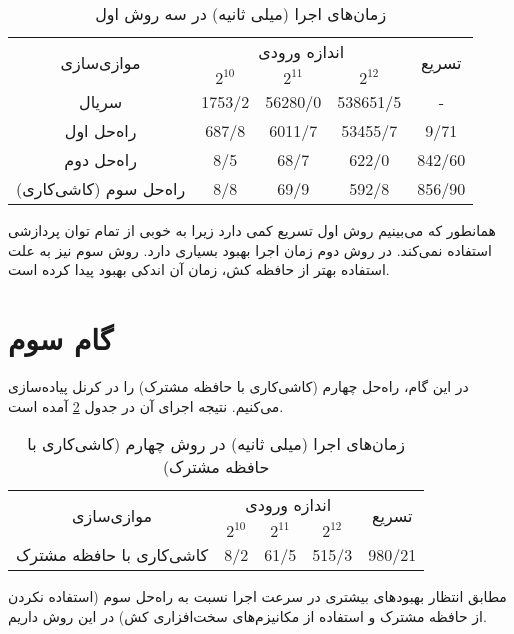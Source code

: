 \documentclass{HW}
\begin{document}
\begin{table}[ht]
\caption{زمان‌های اجرا (میلی ثانیه) در سه روش اول}
\begin{center}
\begin{tabular}{|c|c|c|c|c|}
    \hline
    \multirow{2}{*}{موازی‌سازی} & \multicolumn{3}{|c|}{اندازه ورودی}& \multirow{2}{*}{تسریع} \\
    \cline{2-4}
& $2^{10}$ & $2^{11}$ & $2^{12}$ & \\
    \hline
  سریال & 
  1753/2 & 56280/0 & 538651/5 & - \\ \hline
  
راه‌حل اول &
  687/8 & 6011/7 & 53455/7 & 9/71 \\ \hline
  
راه‌حل دوم & 
  8/5 & 68/7 & 622/0 & 842/60 \\ \hline
 
 راه‌حل سوم (کاشی‌کاری) & 
  8/8 & 69/9 & 592/8 & 856/90 \\ \hline
\end{tabular}
\end{center}
\label{tab:section2-results}
\end{table}

همانطور که می‌بینیم روش اول تسریع کمی دارد زیرا به خوبی از تمام توان پردازشی  استفاده نمی‌کند. در روش دوم زمان اجرا بهبود بسیاری دارد. روش سوم نیز به علت استفاده بهتر از حافظه کش، زمان ‌آن اندکی بهبود پیدا کرده است.


\section{گام سوم}

در این گام، راه‌حل چهارم (کاشی‌کاری با حافظه مشترک) را در کرنل  پیاده‌سازی می‌کنیم. نتیجه اجرای آن در جدول
\ref{tab:section3-results}
آمده است.

\begin{table}[ht]
\caption{زمان‌های اجرا (میلی ثانیه) در روش چهارم (کاشی‌کاری با حافظه مشترک)}
\begin{center}
\begin{tabular}{|c|c|c|c|c|}
    \hline
    \multirow{2}{*}{موازی‌سازی} & \multicolumn{3}{|c|}{اندازه ورودی}& \multirow{2}{*}{تسریع} \\
    \cline{2-4}
& $2^{10}$ & $2^{11}$ & $2^{12}$ & \\
    \hline
  کاشی‌کاری با حافظه مشترک & 
  8/2 & 61/5 & 515/3 &  980/21 \\ \hline

\end{tabular}
\end{center}
\label{tab:section3-results}
\end{table}

مطابق انتظار بهبودهای بیشتری در سرعت اجرا نسبت به راه‌حل سوم (استفاده نکردن از حافظه مشترک و استفاده از مکانیزم‌های سخت‌افزاری کش) در این روش داریم.


\end{document}
